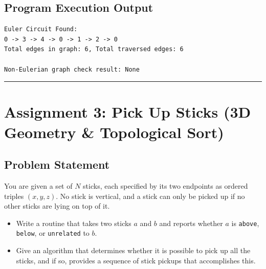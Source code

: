 \documentclass[12pt]{article}
\begin{document}
\subsection*{Program Execution Output}
\begin{lstlisting}[style=output]
Euler Circuit Found:
0 -> 3 -> 4 -> 0 -> 1 -> 2 -> 0
Total edges in graph: 6, Total traversed edges: 6

Non-Eulerian graph check result: None
\end{lstlisting}

\vspace{0.5cm}
\hrule
\vspace{0.5cm}

\section*{Assignment 3: Pick Up Sticks (3D Geometry \& Topological Sort)}

\subsection*{Problem Statement}
You are given a set of $N$ sticks, each specified by its two endpoints as ordered triples $(x, y, z)$. No stick is vertical, and a stick can only be picked up if no other sticks are lying on top of it.
\begin{itemize}
    \item[(a)] Write a routine that takes two sticks $a$ and $b$ and reports whether $a$ is \texttt{above}, \texttt{below}, or \texttt{unrelated} to $b$.
    \item[(b)] Give an algorithm that determines whether it is possible to pick up all the sticks, and if so, provides a sequence of stick pickups that accomplishes this.
\end{itemize}
\end{document}
